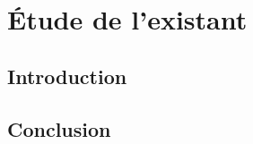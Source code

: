 \chapter{Étude de l'existant}
\clearpage
\label{sec:organisme}

\section{Introduction}


\medskip

\section{Conclusion}

